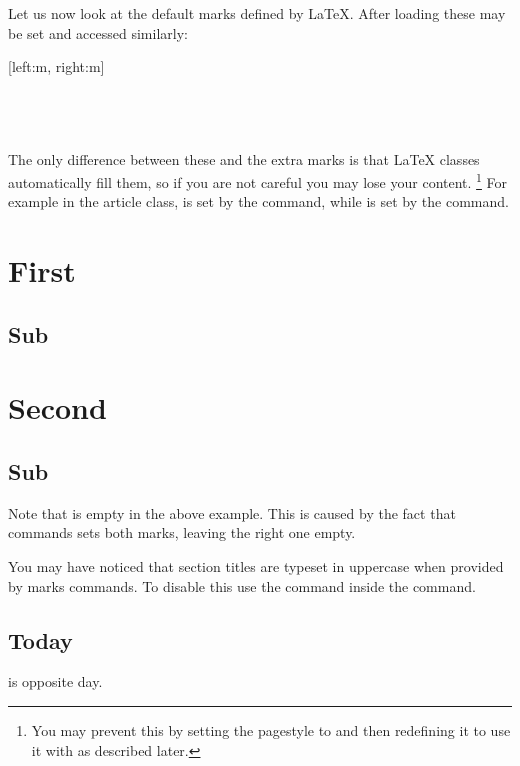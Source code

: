 Let us now look at the default marks defined by \LaTeX{}. After loading
 these may be set and accessed similarly:
\begin{lscommand}
  [left:m, right:m] \\
   \\
   \\
   \\
\end{lscommand}
The only difference between these and the extra marks is that \LaTeX{} classes
automatically fill them, so if you are not careful you may lose your content.
\footnote{You may prevent this by setting the pagestyle to 
  and then redefining it to use it with  as described later.}
For example in the article class,  is set by the 
command, while  is set by the  command.
\begin{example}[standalone, paperheight=5cm]
\geometry{includehead, includefoot, headsep=.5em, footskip=1em} %
\sloppy %
\usepackage{fancyhdr}%
\usepackage{extramarks}%
\pagestyle{fancy}%
\fancyhead[L]{\firstleftmark}
\fancyhead[R]{\lastleftmark}
\fancyfoot[L]{\firstrightmark}
\fancyfoot[R]{\lastrightmark}

\section{First}
\subsection{Sub}
\section{Second}
\subsection{Sub}
\end{example}
Note that  is empty in the above example. This is caused by
the fact that  commands sets both marks, leaving the right one
empty.

You may have noticed that section titles are typeset in uppercase when provided by
marks commands. To disable this use the  command inside the 
command.
\begin{example}[standalone, paperheight=3cm]
\geometry{includehead, includefoot, headsep=.5em, footskip=1em} %
\sloppy %
\usepackage{fancyhdr}%
\usepackage{extramarks}%
\pagestyle{fancy}%
\fancyhead[R]{%
  \nouppercase{\firstleftmark}%
}

\section{Today}
is opposite day.
\end{example}


